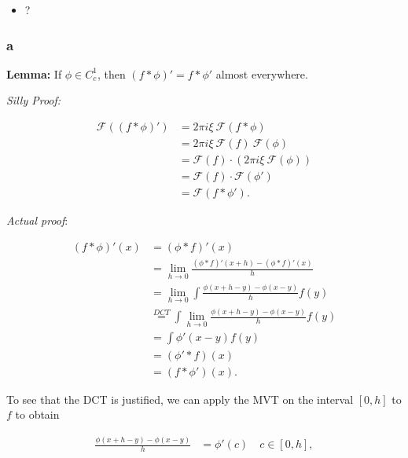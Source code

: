 \begin{solution}

\hfill

\begin{concept}

\hfill

\begin{itemize}
\tightlist
\item
  ?
\end{itemize}

\end{concept}

\hypertarget{a-13}{%
\subsubsection{a}\label{a-13}}

\textbf{Lemma:} If \(\phi \in C_c^1\), then
\((f \ast \phi)' = f \ast \phi'\) almost everywhere.

\emph{Silly Proof:}

\begin{align*}
\mathcal{F}(
    (f \ast \phi)'
 )
&= 2\pi i \xi ~\mathcal{F}(f\ast \phi) \\
&= 2\pi i \xi ~ \mathcal{F}(f) ~ \mathcal{F}(\phi) \\
&= \mathcal{F}(f) \cdot \left( 2\pi i \xi ~\mathcal{F}(\phi)\right) \\
&= \mathcal{F}(f) \cdot \mathcal{F}(\phi') \\
&= \mathcal{F}(f\ast \phi')
.\end{align*}

\emph{Actual proof}:

\begin{align*}
(f\ast \phi)'(x)
&= (\phi\ast f)'(x) \\
&= \lim_{h\to 0} \frac{(\phi\ast f)'(x+h) - (\phi\ast f)'(x)}{h} \\
&= \lim_{h\to 0} \int \frac{\phi(x + h - y) - \phi(x - y)}{h} f(y) \\
&\overset{DCT}=  \int \lim_{h\to 0} \frac{\phi(x + h - y) - \phi(x - y)}{h} f(y) \\
&= \int \phi'(x-y) f(y) \\
&= (\phi' \ast f)(x) \\
&= (f \ast \phi')(x)
.\end{align*}

To see that the DCT is justified, we can apply the MVT on the interval
\([0, h]\) to \(f\) to obtain

\begin{align*}
\frac{\phi(x + h - y) - \phi(x - y)}{h}
&= \phi'(c) \quad c\in [0, h]
,\end{align*}


\end{solution}
